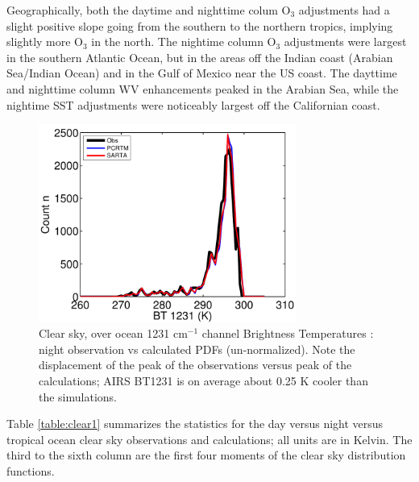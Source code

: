 \documentclass[agupp]{aguplus}              %
\newcommand{\wn}{cm$^{-1}$\xspace}
\newcommand{\ozone}{O$_3$\xspace}
\begin{document}
\begin{article}
Geographically, both the daytime and nighttime colum \ozone
adjustments had a slight positive slope going from the southern to the
northern tropics, implying slightly more \ozone in the north.  The
nightime column \ozone adjustments were largest in the southern
Atlantic Ocean, but in the areas off the Indian coast (Arabian
Sea/Indian Ocean) and in the Gulf of Mexico near the US coast. The
dayttime and nighttime column WV enhancements peaked in the Arabian
Sea, while the nightime SST adjustments were noticeably largest off
the Californian coast.

\begin{figure}[h]
\noindent\includegraphics[width=20pc]{FIGS/ecm_clearBT1231_pdf}
\caption{Clear sky, over ocean  1231 \wn channel Brightness Temperatures : night 
observation vs calculated PDFs (un-normalized). Note the displacement of the peak of the 
observations versus peak of the calculations; AIRS BT1231 is on average about 0.25 K cooler 
than the simulations.}
\label{bt1231_clear_obs_pdf}
\end{figure}

Table \ref{table:clear1} summarizes the statistics for the day versus
night versus tropical ocean clear sky observations and calculations;
all units are in Kelvin. The third to the sixth column are the first
four moments of the clear sky distribution functions. 


\end{article}
\end{document}
